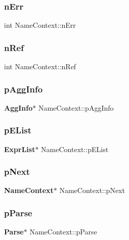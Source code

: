 \subsubsection{nErr}
{\footnotesize\ttfamily int Name\+Context\+::n\+Err}

\mbox{\label{struct_name_context_ad68616ce2a58fa1b135e0dcf953bdc97}} 
\subsubsection{nRef}
{\footnotesize\ttfamily int Name\+Context\+::n\+Ref}

\mbox{\label{struct_name_context_aeb3ff72c03dd770d421cadc2195a5644}} 
\subsubsection{pAggInfo}
{\footnotesize\ttfamily \textbf{ Agg\+Info}$\ast$ Name\+Context\+::p\+Agg\+Info}

\mbox{\label{struct_name_context_a8c752d7fb9b28179156c569cc57ba6f2}} 
\subsubsection{pEList}
{\footnotesize\ttfamily \textbf{ Expr\+List}$\ast$ Name\+Context\+::p\+E\+List}

\mbox{\label{struct_name_context_a82ce0ec8a3cc3d792e1f38bb5e0ad5fc}} 
\subsubsection{pNext}
{\footnotesize\ttfamily \textbf{ Name\+Context}$\ast$ Name\+Context\+::p\+Next}

\mbox{\label{struct_name_context_a14635249bf75d5e18124089571dd2386}} 
\subsubsection{pParse}
{\footnotesize\ttfamily \textbf{ Parse}$\ast$ Name\+Context\+::p\+Parse}


